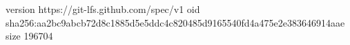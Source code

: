 version https://git-lfs.github.com/spec/v1
oid sha256:aa2bc9abcb72d8c1885d5e5ddc4c820485d9165540fd4a475e2e383646914aae
size 196704
